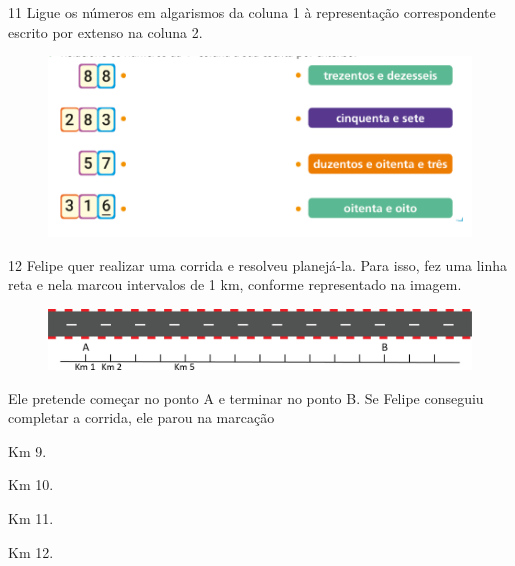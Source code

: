 \num{11} Ligue os números em algarismos da coluna 1 
à representação correspondente escrito por extenso na coluna 2.

\begin{figure}[htpb!]
\centering
\includegraphics[width=\textwidth]{./media/image5.png}
\end{figure}



\num{12} Felipe quer realizar uma corrida e resolveu planejá-la. Para isso, fez
uma linha reta e nela marcou intervalos de 1 km, conforme representado na imagem.

\begin{figure}[htpb!]
\centering
\includegraphics[width=\textwidth]{./media/image6.png}
\end{figure}


Ele pretende começar no ponto A e terminar no ponto B. Se Felipe
conseguiu completar a corrida, ele parou na marcação

\begin{minipage}{.5\textwidth}
\begin{escolha}
\item Km 9.

\item Km 10.

\item Km 11.

\item Km 12.
\end{escolha}
\end{minipage}


